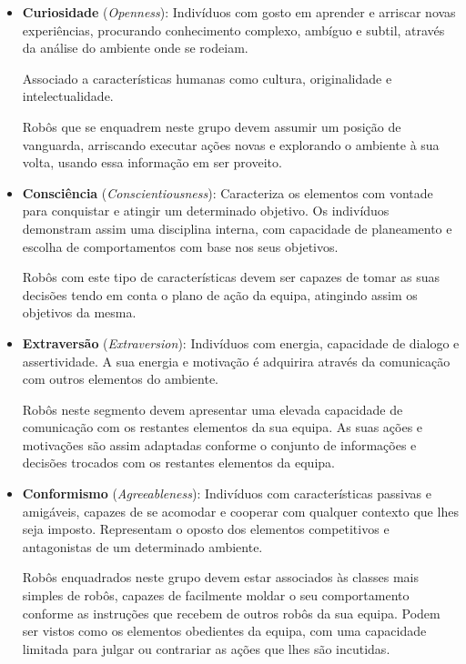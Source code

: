 \begin{itemize}
    \item \textbf{Curiosidade} (\textit{Openness}): Indivíduos com gosto em aprender e arriscar novas experiências, procurando conhecimento complexo, ambíguo e subtil, através da análise do ambiente onde se rodeiam.

    Associado a características humanas como cultura, originalidade e intelectualidade. 
    
    Robôs que se enquadrem neste grupo devem assumir um posição de vanguarda, arriscando executar ações novas e explorando o ambiente à sua volta, usando essa informação em ser proveito. 
    
    \item \textbf{Consciência} (\textit{Conscientiousness}): Caracteriza os elementos com vontade para conquistar e atingir um determinado objetivo. Os indivíduos demonstram assim uma disciplina interna, com capacidade de planeamento e escolha de comportamentos com base nos seus objetivos. 
    
    Robôs com este tipo de características devem ser capazes de tomar as suas decisões tendo em conta o plano de ação da equipa, atingindo assim os objetivos da mesma. 
    
    \item \textbf{Extraversão} (\textit{Extraversion}): Indivíduos com energia, capacidade de dialogo e assertividade. A sua energia e motivação é adquirira através da comunicação com outros elementos do ambiente. 
    
    Robôs neste segmento devem apresentar uma elevada capacidade de comunicação com os restantes elementos da sua equipa. 
    As suas ações e motivações são assim adaptadas conforme o conjunto de informações e decisões trocados com os restantes elementos da equipa. 
    
    \item \textbf{Conformismo} (\textit{Agreeableness}): Indivíduos com características passivas e amigáveis, capazes de se acomodar e cooperar com qualquer contexto que lhes seja imposto. Representam o oposto dos elementos competitivos e antagonistas de um determinado ambiente. 
    
    Robôs enquadrados neste grupo devem estar associados às classes mais simples de robôs, capazes de facilmente moldar o seu comportamento conforme as instruções que recebem de outros robôs da sua equipa. 
    Podem ser vistos como os elementos obedientes da equipa, com uma capacidade limitada para julgar ou contrariar as ações que lhes são incutidas. 
    

\end{itemize}
